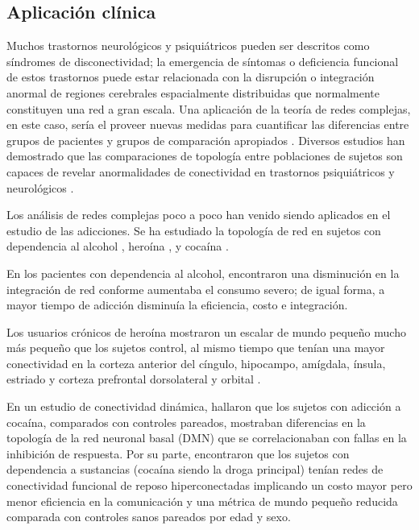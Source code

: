 \subsection{Aplicación clínica}
Muchos trastornos neurológicos y psiquiátricos pueden ser descritos como síndromes de disconectividad; la emergencia de síntomas o deficiencia funcional de estos trastornos puede estar relacionada con la disrupción o integración anormal de regiones cerebrales espacialmente distribuidas que normalmente constituyen una red a gran escala. Una aplicación de la teoría de redes complejas, en este caso, sería el proveer nuevas medidas para cuantificar las diferencias entre grupos de pacientes y grupos de comparación apropiados \parencite{Bullmore2009a}. Diversos estudios han demostrado que las comparaciones de topología entre poblaciones de sujetos son capaces de revelar anormalidades de conectividad en trastornos psiquiátricos y neurológicos \parencite{Bassett2009}. \par
Los análisis de redes complejas poco a poco han venido siendo aplicados en el estudio de las adicciones. Se ha estudiado la topología de red en sujetos con dependencia al alcohol \parencite{Sjoerds2017}, heroína \parencite{Liu2009}, y cocaína \parencite{Zhang2018, Wang2015a}. \par
En los pacientes con dependencia al alcohol, \textcite{Sjoerds2017} encontraron una disminución en la integración de red conforme aumentaba el consumo severo; de igual forma, a mayor tiempo de adicción disminuía la eficiencia, costo e integración.\par
Los usuarios crónicos de heroína mostraron un escalar de mundo pequeño mucho más pequeño que los sujetos control, al mismo tiempo que tenían una mayor conectividad en la corteza anterior del cíngulo, hipocampo, amígdala, ínsula, estriado y corteza prefrontal dorsolateral y orbital \parencite{Liu2009}. \par
En un estudio de conectividad dinámica, \textcite{Zhang2018} hallaron que los sujetos con adicción a cocaína, comparados con controles pareados, mostraban diferencias en la topología de la red neuronal basal (DMN) que se correlacionaban con fallas en la inhibición de respuesta.
Por su parte, \textcite{Wang2015a} encontraron que los sujetos con dependencia a sustancias (cocaína siendo la droga principal) tenían redes de conectividad funcional de reposo hiperconectadas \textemdash{}implicando un costo mayor\textemdash{} pero menor eficiencia en la comunicación y una métrica de mundo pequeño reducida comparada con controles sanos pareados por edad y sexo.
